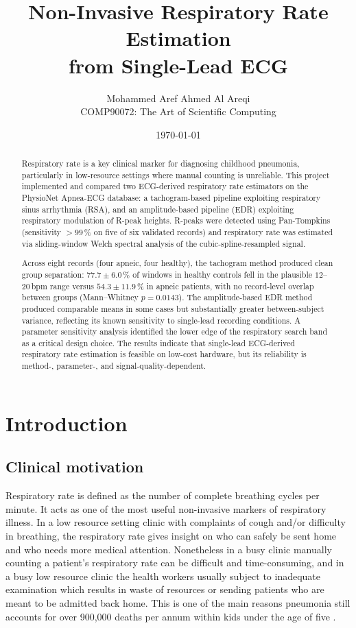 \documentclass[11pt,a4paper]{article}
\title{Non-Invasive Respiratory Rate Estimation \\ from Single-Lead ECG}
\author{Mohammed Aref Ahmed Al Areqi \\ COMP90072: The Art of Scientific Computing}
\date{\today}
\begin{document}
\maketitle

\begin{abstract}
Respiratory rate is a key clinical marker for diagnosing childhood pneumonia, particularly in low-resource settings where manual counting is unreliable. This project implemented and compared two ECG-derived respiratory rate estimators on the PhysioNet Apnea-ECG database: a tachogram-based pipeline exploiting respiratory sinus arrhythmia (RSA), and an amplitude-based pipeline (EDR) exploiting respiratory modulation of R-peak heights. R-peaks were detected using Pan-Tompkins (sensitivity $>99\,\%$ on five of six validated records) and respiratory rate was estimated via sliding-window Welch spectral analysis of the cubic-spline-resampled signal.

Across eight records (four apneic, four healthy), the tachogram method produced clean group separation: $77.7 \pm 6.0\,\%$ of windows in healthy controls fell in the plausible $12$--$20$\,bpm range versus $54.3 \pm 11.9\,\%$ in apneic patients, with no record-level overlap between groups (Mann--Whitney $p = 0.0143$). The amplitude-based EDR method produced comparable means in some cases but substantially greater between-subject variance, reflecting its known sensitivity to single-lead recording conditions. A parameter sensitivity analysis identified the lower edge of the respiratory search band as a critical design choice. The results indicate that single-lead ECG-derived respiratory rate estimation is feasible on low-cost hardware, but its reliability is method-, parameter-, and signal-quality-dependent.
\end{abstract}

\section{Introduction}

\subsection{Clinical motivation}
Respiratory rate is defined as the number of complete breathing cycles per minute. It acts as one of the most useful non-invasive markers of respiratory illness. In a low resource setting clinic with complaints of cough and/or difficulty in breathing, the respiratory rate gives insight on who can safely be sent home and who needs more medical attention. Nonetheless in a busy clinic manually counting a patient's respiratory rate can be difficult and time-consuming, and in a busy low resource clinic the health workers usually subject to inadequate examination which results in waste of resources or sending patients who are meant to be admitted back home. This is one of the main reasons pneumonia still accounts for over 900,000 deaths per annum within kids under the age of five \cite{penzel2000apnea}.
\end{document}

